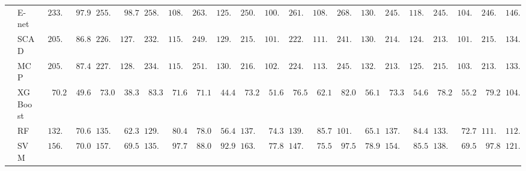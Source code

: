 \begin{tabular}{ll|ll|llllll|llllll|llllll}
 & E-net  & $\phantom{0}233.79$ & $\phantom{00}97.92$ & $\phantom{0}255.01$ & $\phantom{00}98.72$ & $\phantom{0}258.97$ & $\phantom{0}108.30$ & $\phantom{0}263.87$ & $\phantom{0}125.10$ & $\phantom{0}250.86$ & $\phantom{0}100.42$ & $\phantom{0}261.23$ & $\phantom{0}108.73$ & $\phantom{0}268.62$ & $\phantom{0}130.77$ & $\phantom{0}245.16$ & $\phantom{0}118.43$ & $\phantom{0}245.80$ & $\phantom{0}104.02$ & $\phantom{0}246.44$ & $\phantom{0}146.49$ \\
 & SCAD  & $\phantom{0}205.17$ & $\phantom{00}86.88$ & $\phantom{0}226.24$ & $\phantom{0}127.85$ & $\phantom{0}232.61$ & $\phantom{0}115.92$ & $\phantom{0}249.62$ & $\phantom{0}129.18$ & $\phantom{0}215.47$ & $\phantom{0}101.50$ & $\phantom{0}222.27$ & $\phantom{0}111.04$ & $\phantom{0}241.80$ & $\phantom{0}130.76$ & $\phantom{0}214.79$ & $\phantom{0}124.36$ & $\phantom{0}213.61$ & $\phantom{0}101.64$ & $\phantom{0}215.18$ & $\phantom{0}134.38$ \\
 & MCP  & $\phantom{0}205.29$ & $\phantom{00}87.41$ & $\phantom{0}227.73$ & $\phantom{0}128.54$ & $\phantom{0}234.30$ & $\phantom{0}115.18$ & $\phantom{0}251.13$ & $\phantom{0}130.71$ & $\phantom{0}216.29$ & $\phantom{0}102.71$ & $\phantom{0}224.40$ & $\phantom{0}113.52$ & $\phantom{0}245.58$ & $\phantom{0}132.53$ & $\phantom{0}213.23$ & $\phantom{0}125.25$ & $\phantom{0}215.38$ & $\phantom{0}103.28$ & $\phantom{0}213.92$ & $\phantom{0}133.03$ \\
 & XGBoost  & $\phantom{00}70.20$ & $\phantom{00}49.63$ & $\phantom{00}73.03$ & $\phantom{00}38.31$ & $\phantom{00}83.31$ & $\phantom{00}71.68$ & $\phantom{00}71.12$ & $\phantom{00}44.41$ & $\phantom{00}73.20$ & $\phantom{00}51.60$ & $\phantom{00}76.55$ & $\phantom{00}62.10$ & $\phantom{00}82.02$ & $\phantom{00}56.11$ & $\phantom{00}73.38$ & $\phantom{00}54.67$ & $\phantom{00}78.24$ & $\phantom{00}55.20$ & $\phantom{00}79.24$ & $\phantom{0}104.03$ \\
 & RF  & $\phantom{0}132.20$ & $\phantom{00}70.67$ & $\phantom{0}135.02$ & $\phantom{00}62.39$ & $\phantom{0}129.19$ & $\phantom{00}80.46$ & $\phantom{00}78.00$ & $\phantom{00}56.47$ & $\phantom{0}137.83$ & $\phantom{00}74.39$ & $\phantom{0}139.50$ & $\phantom{00}85.73$ & $\phantom{0}101.60$ & $\phantom{00}65.12$ & $\phantom{0}137.14$ & $\phantom{00}84.48$ & $\phantom{0}133.67$ & $\phantom{00}72.70$ & $\phantom{0}111.36$ & $\phantom{0}112.94$ \\
 & SVM  & $\phantom{0}156.19$ & $\phantom{00}70.03$ & $\phantom{0}157.92$ & $\phantom{00}69.55$ & $\phantom{0}135.78$ & $\phantom{00}97.70$ & $\phantom{00}88.04$ & $\phantom{00}92.92$ & $\phantom{0}163.78$ & $\phantom{00}77.87$ & $\phantom{0}147.20$ & $\phantom{00}75.53$ & $\phantom{00}97.56$ & $\phantom{00}78.99$ & $\phantom{0}154.76$ & $\phantom{00}85.58$ & $\phantom{0}138.06$ & $\phantom{00}69.51$ & $\phantom{00}97.82$ & $\phantom{0}121.65$ \\\hline

\end{tabular}
